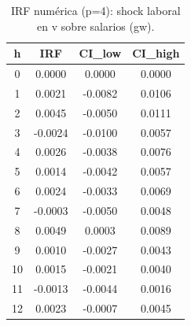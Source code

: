 \begin{table}[htbp]
\centering
\caption{IRF numérica (p=4): shock laboral en v sobre salarios (gw).}
\label{tab_irf_v_gw_p4}
\footnotesize
\begin{tabular}{cccc}
\toprule
h & IRF & CI_low & CI_high \\
\midrule
 0 & 0.0000 & 0.0000 & 0.0000 \\
 1 & 0.0021 & -0.0082 & 0.0106 \\
 2 & 0.0045 & -0.0050 & 0.0111 \\
 3 & -0.0024 & -0.0100 & 0.0057 \\
 4 & 0.0026 & -0.0038 & 0.0076 \\
 5 & 0.0014 & -0.0042 & 0.0057 \\
 6 & 0.0024 & -0.0033 & 0.0069 \\
 7 & -0.0003 & -0.0050 & 0.0048 \\
 8 & 0.0049 & 0.0003 & 0.0089 \\
 9 & 0.0010 & -0.0027 & 0.0043 \\
10 & 0.0015 & -0.0021 & 0.0040 \\
11 & -0.0013 & -0.0044 & 0.0016 \\
12 & 0.0023 & -0.0007 & 0.0045 \\
\bottomrule
\end{tabular}
\end{table}

